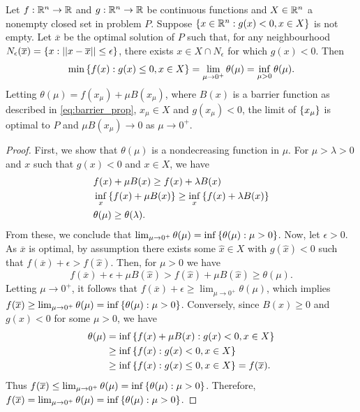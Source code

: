 \begin{theorem}\label{thm:convergence}
Let $f:\mathbb{R}^n\rightarrow \mathbb{R}$ and $g: \mathbb{R}^n \rightarrow \mathbb{R}$ be continuous functions and $X\in\mathbb{R}^n$ a nonempty closed set in problem $P$. Suppose $\left\{ x \in \mathbb{R}^n : g(x) < 0, x \in X \right \}$ is not empty. Let $\overline{x}$ be the optimal solution of $P$ such that, for any neighbourhood $N_\epsilon(\overline{x}) = \left\{ x : ||x - \overline{x}|| \leq \epsilon \right \}$, there exists $x \in X \cap N_\epsilon$ for which $g(x) < 0$. Then
$$
\min\left\{ f(x) : g(x) \leq 0, x \in X \right \} = \lim_{\mu \rightarrow 0^+} \theta(\mu) = \inf_{\mu > 0} \theta(\mu).
$$
Letting $\theta(\mu) = f(x_{\mu}) + \mu B(x_{\mu})$, where $B(x)$ is a barrier function as described in \eqref{eq:barrier_prop}, $x_{\mu} \in X$ and $g(x_{\mu}) < 0$, the limit of $\left\{ x_{\mu} \right \}$ is optimal to $P$ and $\mu B(x_{\mu})\rightarrow 0$ as $\mu \rightarrow 0^+$.
\end{theorem}

\begin{proof}
First, we show that $\theta(\mu)$ is a nondecreasing function in $\mu$. For $\mu > \lambda > 0$ and $x$ such that $g(x) < 0$ and $x \in X$, we have
%
\begin{align*}
& f(x) + \mu B(x) \geq f(x) + \lambda B(x) \\
& \inf_x \left\{ f(x) + \mu B(x) \right \} \geq \inf_x \left\{ f(x) + \lambda B(x) \right \} \\
& \theta(\mu)	\geq  \theta(\lambda).
\end{align*}
%
From these, we conclude that $\lim_{\mu \rightarrow 0^+}\theta(\mu)=\inf\left\{ \theta(\mu) : \mu > 0 \right \}$. Now, let $\epsilon >0$. As $\overline{x}$ is optimal, by assumption there exists some $\hat{x} \in X$ with $g(\hat{x}) < 0$ such that $f(\overline{x}) + \epsilon > f(\hat{x})$. Then, for $\mu > 0$ we have 
%
$$
f(\overline{x}) + \epsilon + \mu B(\hat{x}) > f(\hat{x}) + \mu B(\hat{x}) \geq \theta(\mu).
$$ 
Letting $\mu \rightarrow 0^+$, it follows that $f(\overline{x}) + \epsilon \geq \lim_{\mu \rightarrow 0^+}
\theta(\mu)$, which implies $f(\overline{x}) \geq \lim_{\mu \rightarrow 0^+}\theta(\mu)= \inf\left\{ \theta(\mu) : \mu > 0 \right \} $. Conversely, since $B(x) \geq 0$ and $g(x) < 0$ for some $\mu > 0$, we have
\begin{align*}
\theta(\mu) &= \inf\left\{ f(x) + \mu B(x) : g(x) < 0, x \in X \right \}\\ 
&\geq \inf\left\{ f(x) : g(x) < 0, x \in X \right \}\\
&\geq \inf\left\{ f(x) : g(x) \leq 0, x \in X \right \} = f(\overline{x}).
\end{align*}
Thus $f(\overline{x}) \leq \lim_{\mu \rightarrow 0^+}\theta(\mu)= \inf\left\{ \theta(\mu) : \mu > 0 \right \}$. Therefore, $f(\overline{x}) = \lim_{\mu \rightarrow 0^+}\theta(\mu)= \inf\left\{ \theta(\mu) : \mu > 0 \right \}$.
\end{proof}

